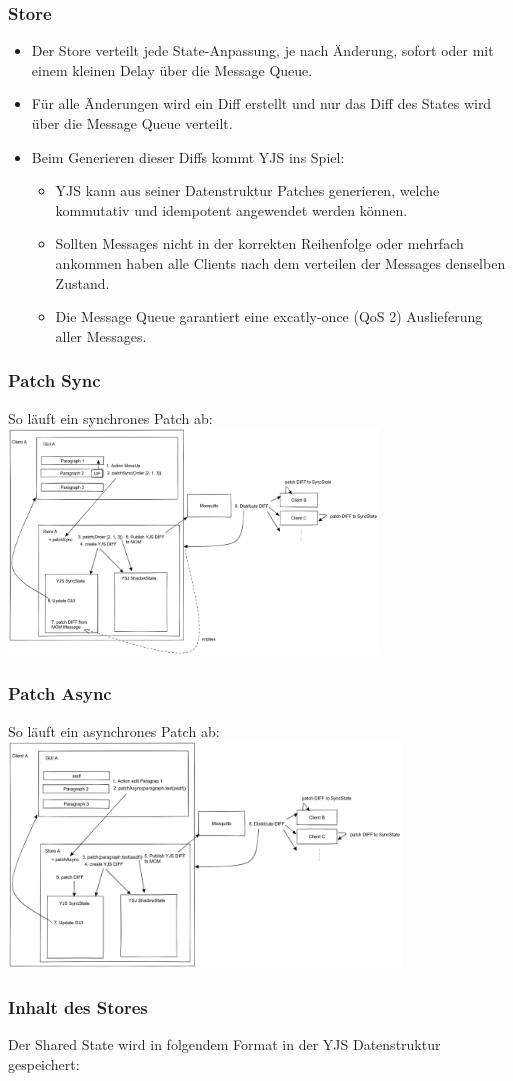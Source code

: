\begin{frame}
    \frametitle{Store}
    \begin{itemize}
        \item Der Store verteilt jede State-Anpassung, je nach Änderung, sofort oder mit einem kleinen Delay über die Message Queue.
        \item Für alle Änderungen wird ein Diff erstellt und nur das Diff des States wird über die Message Queue verteilt.
        \item Beim Generieren dieser Diffs kommt YJS ins Spiel:
        \begin{itemize}
            \item YJS kann aus seiner Datenstruktur Patches generieren, welche kommutativ und idempotent angewendet werden können.
            \item Sollten Messages nicht in der korrekten Reihenfolge oder mehrfach ankommen haben alle Clients nach dem verteilen der Messages denselben Zustand.
            \item Die Message Queue garantiert eine excatly-once (QoS 2) Auslieferung aller Messages.
        \end{itemize}
    \end{itemize}
\end{frame}

\begin{frame}
    \frametitle{Patch Sync}
    So läuft ein synchrones Patch ab:
    \centering
    \includegraphics[height=6cm]{media/patchSync}\label{fig:Patch Sync Skizze}
\end{frame}

\begin{frame}
    \frametitle{Patch Async}
    So läuft ein asynchrones Patch ab:
    \centering
    \includegraphics[height=6cm]{media/patchAsync}\label{fig:Patch Async Skizze}
\end{frame}

\begin{frame}
    \frametitle{Inhalt des Stores}
    Der Shared State wird in folgendem Format in der YJS Datenstruktur gespeichert:
    
\end{frame}



